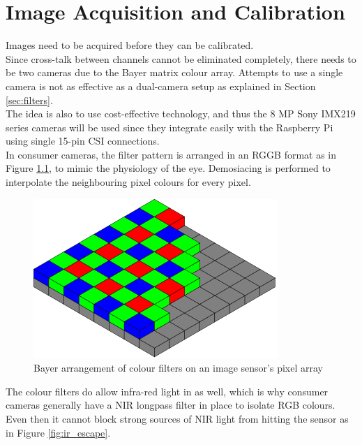 \chapter{Image Acquisition and Calibration}

Images need to be acquired before they can be calibrated.\\

Since cross-talk between channels cannot be eliminated completely, there needs to be two cameras due to the Bayer matrix colour array. Attempts to use a single camera is not as effective as a dual-camera setup as explained in Section \ref{sec:filters}.\\

The idea is also to use cost-effective technology, and thus the 8 MP Sony IMX219 series cameras will be used since they integrate easily with the Raspberry Pi using single 15-pin CSI connections.\\


In consumer cameras, the filter pattern is arranged in an RGGB format as in Figure \ref{fig:bayer}, to mimic the physiology of the eye. Demosiacing is performed to interpolate the neighbouring pixel colours for every pixel.

\begin{figure}[H]
\centering
\includegraphics[scale=0.35]{images/bayer.png}
\caption{Bayer arrangement of colour filters on an image sensor's pixel array \cite{bayer}}
\label{fig:bayer}
\end{figure}

The colour filters do allow infra-red light in as well, which is why consumer cameras generally have a NIR longpass filter in place to isolate RGB colours. Even then it cannot block strong sources of NIR light from hitting the sensor as in Figure \ref{fig:ir_escape}.


